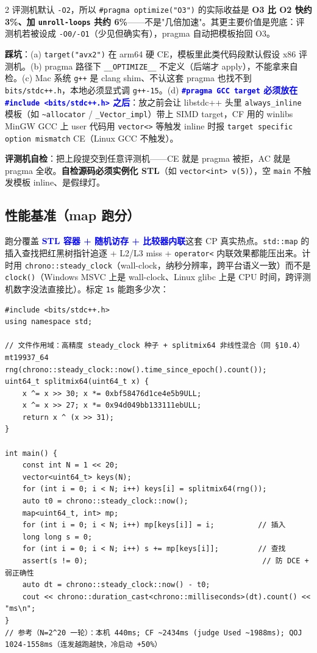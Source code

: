 \begin{multicols*}{2}
	评测机默认 \texttt{-O2}，所以 \texttt{\#pragma optimize("O3")} 的实际收益是 \textbf{O3 比 O2 快约 3\%、加 \texttt{unroll-loops} 共约 6\%}——不是"几倍加速"。其更主要价值是兜底：评测机若被设成 \texttt{-O0/-O1}（少见但确实有），pragma 自动把模板抬回 O3。

	\textbf{踩坑}：(a) \texttt{target("avx2")} 在 arm64 硬 CE，模板里此类代码段默认假设 x86 评测机。(b) pragma 路径下 \texttt{\_\_OPTIMIZE\_\_} 不定义（后端才 apply），不能拿来自检。(c) Mac 系统 \texttt{g++} 是 clang shim、不认这套 pragma 也找不到 \texttt{bits/stdc++.h}，本地必须显式调 \texttt{g++-15}。(d) \textcolor{blue}{\textbf{\texttt{\#pragma GCC target} 必须放在 \texttt{\#include <bits/stdc++.h>} 之后}}：放之前会让 libstdc++ 头里 \texttt{always\_inline} 模板（如 \texttt{\textasciitilde{}allocator} / \texttt{\_Vector\_impl}）带上 SIMD target，CF 用的 winlibs MinGW GCC 上 user 代码用 \texttt{vector<>} 等触发 inline 时报 \texttt{target specific option mismatch} CE（Linux GCC 不触发）。

	\textbf{评测机自检}：把上段提交到任意评测机——CE 就是 pragma 被拒，AC 就是 pragma 全收。\textbf{自检源码必须实例化 STL}（如 \texttt{vector<int> v(5)}），空 \texttt{main} 不触发模板 inline、是假绿灯。

	\subsection{性能基准（map 跑分）}

	跑分覆盖 \textcolor{blue}{\textbf{STL 容器 + 随机访存 + 比较器内联}}这套 CP 真实热点。\texttt{std::map} 的插入查找把红黑树指针追逐 + L2/L3 miss + \texttt{operator<} 内联效果都能压出来。计时用 \texttt{chrono::steady\_clock}（wall-clock，纳秒分辨率，跨平台语义一致）而不是 \texttt{clock()}（Windows MSVC 上是 wall-clock、Linux glibc 上是 CPU 时间，跨评测机数字没法直接比）。标定 \texttt{1s} 能跑多少次：

	\begin{verbatim}
#include <bits/stdc++.h>
using namespace std;

// 文件作用域：高精度 steady_clock 种子 + splitmix64 非线性混合（同 §10.4）
mt19937_64 rng(chrono::steady_clock::now().time_since_epoch().count());
uint64_t splitmix64(uint64_t x) {
    x ^= x >> 30; x *= 0xbf58476d1ce4e5b9ULL;
    x ^= x >> 27; x *= 0x94d049bb133111ebULL;
    return x ^ (x >> 31);
}

int main() {
    const int N = 1 << 20;
    vector<uint64_t> keys(N);
    for (int i = 0; i < N; i++) keys[i] = splitmix64(rng());
    auto t0 = chrono::steady_clock::now();
    map<uint64_t, int> mp;
    for (int i = 0; i < N; i++) mp[keys[i]] = i;          // 插入
    long long s = 0;
    for (int i = 0; i < N; i++) s += mp[keys[i]];         // 查找
    assert(s != 0);                                        // 防 DCE + 弱正确性
    auto dt = chrono::steady_clock::now() - t0;
    cout << chrono::duration_cast<chrono::milliseconds>(dt).count() << "ms\n";
}
// 参考（N=2^20 一轮）：本机 440ms; CF ~2434ms (judge Used ~1988ms); QOJ 1024-1558ms（连发越跑越快，冷启动 +50%）
	\end{verbatim}


\end{multicols*}
